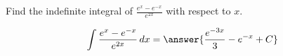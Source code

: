 \documentclass{ximera}
\author{Gregory Hartman \and Matthew Carr}
\begin{document}
\begin{exercise}

Find the indefinite integral of $\frac{e^x-e^{-x}}{e^{2x}}$ with respect to $x$.

\[
\int \frac{e^x-e^{-x}}{e^{2x}}\d x=\answer{\frac{e^{-3 x}}{3}-e^{-x}+C}
\]

\end{exercise}
\end{document}
